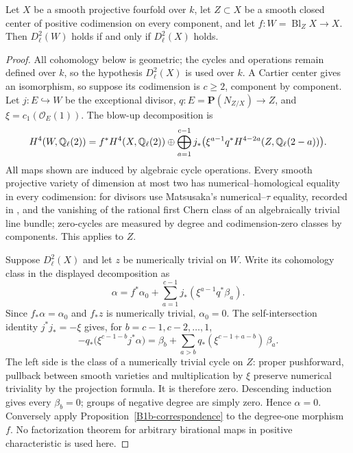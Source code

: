 \begin{lemma}
\label{B1b-blowup}
Let $X$ be a smooth projective fourfold over $k$, let $Z\subset X$ be
a smooth closed center of positive codimension on every component,
and let $f:W=\operatorname{Bl}_ZX\to X$.
Then $D^2_\ell(W)$ holds if and only if $D^2_\ell(X)$ holds.
\end{lemma}
\begin{proof}
All cohomology below is geometric; the cycles and operations remain
defined over $k$, so the hypothesis $D^2_\ell(X)$ is used over $k$.
A Cartier center gives an isomorphism, so suppose its codimension
is $c\ge2$, component by component. Let $j:E\hookrightarrow W$
be the exceptional divisor, $q:E=\mathbf P(N_{Z/X})\to Z$, and
$\xi=c_1(\mathcal O_E(1))$. The blow-up decomposition
\cite[Lemma~2.1, p.~103]{ShiodaKatsura1979C} is
\[
 H^4(W,{\mathbb{Q}}_\ell(2))=
 f^*H^4(X,{\mathbb{Q}}_\ell(2))\oplus
 \bigoplus_{a=1}^{c-1}
 j_*\bigl(\xi^{a-1}q^*H^{4-2a}(Z,{\mathbb{Q}}_\ell(2-a))\bigr).
\]
All maps shown are induced by algebraic cycle operations.
Every smooth projective variety of dimension at most two has
numerical--homological equality in every codimension: for divisors
use Matsusaka's numerical--$\tau$ equality, recorded in
\cite[p.~361]{BKleiman1968}, and the vanishing of the rational first
Chern class of an algebraically trivial line bundle; zero-cycles
are measured by degree and codimension-zero classes by components.
This applies to $Z$.

Suppose $D^2_\ell(X)$ and let $z$ be numerically trivial on $W$.
Write its cohomology class in the displayed decomposition as
\[
 \alpha=f^*\alpha_0+
      \sum_{a=1}^{c-1}j_*(\xi^{a-1}q^*\beta_a).
\]
Since $f_*\alpha=\alpha_0$ and $f_*z$ is numerically trivial,
$\alpha_0=0$. The self-intersection identity $j^*j_*=-\xi$ gives,
for $b=c-1,c-2,\ldots,1$,
\[
 -q_*\bigl(\xi^{c-1-b}j^*\alpha\bigr)
 =\beta_b+\sum_{a>b}
       q_*(\xi^{c-1+a-b})\,\beta_a.
\]
The left side is the class of a numerically trivial cycle on $Z$:
proper pushforward, pullback between smooth varieties and multiplication
by $\xi$ preserve numerical triviality by the projection formula.
It is therefore zero. Descending induction gives every $\beta_b=0$;
groups of negative degree are simply zero. Hence $\alpha=0$.
Conversely apply Proposition~\ref{B1b-correspondence} to the degree-one
morphism $f$. No factorization theorem for arbitrary birational maps
in positive characteristic is used here.
\end{proof}

